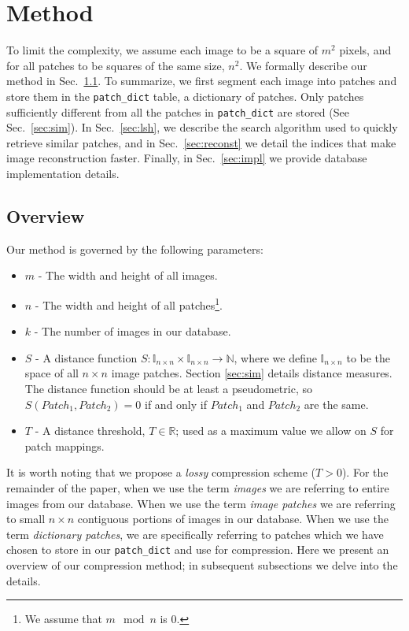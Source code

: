 \section{Method}\label{sec:method}

To limit the complexity, we assume
each image to be a square of $m^2$ pixels, and for all patches to
be squares of the same size, $n^2$.
We formally describe our method in Sec.~\ref{sec:overview}. To summarize,
we first segment each image into patches and store them in the \texttt{patch\_dict} table, a dictionary of patches.
Only patches sufficiently different
from all the patches in \texttt{patch\_dict} are stored (See Sec.~\ref{sec:sim}).
In 
Sec.~\ref{sec:lsh}, we describe the
search algorithm used to quickly retrieve similar patches, and in Sec.~\ref{sec:reconst}
we detail the indices that make image reconstruction faster. Finally, in
Sec.~\ref{sec:impl} we provide database implementation details.

\subsection{Overview}
\label{sec:overview}

Our method is governed by the following parameters:
\begin{itemize}
\item $m$ - The width and height of all images.
\item $n$ - The width and height of all patches\footnote{We assume that $m \mod n$ is $0$.}.
\item $k$ - The number of images in our database.
\item $S$ - A distance function $S \colon \mathds{I}_{n \times n} \times \mathds{I}_{n \times n} \to \mathds{N}$, where we define $\mathds{I}_{n \times n}$ to be the space of all $n \times n$ image patches.  Section \ref{sec:sim} details distance measures.  The distance function should be at least a pseudometric, so $S(Patch_1, Patch_2) = 0$ if and only if $Patch_1$ and $Patch_2$ are the same.
\item $T$ - A distance threshold, $T \in \mathds{R}$; used as a maximum value we allow on $S$ for patch mappings.

\end{itemize}

It is worth noting that we propose a \emph{lossy} compression scheme ($T > 0$).  For the remainder of the paper, when we use the term \emph{images} we are referring to entire images from our database.  When we use the term \emph{image patches} we are referring to small $n \times n$ contiguous portions of images in our database.  When we use the term \emph{dictionary patches}, we are specifically referring to patches which we have chosen to store in our \texttt{patch\_dict} and use for compression.  Here we present an overview of our compression method; in subsequent subsections we delve into the details.  

